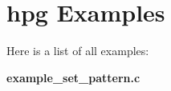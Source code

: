 \section{hpg Examples}
Here is a list of all examples:\begin{CompactItemize}
\item 
{\bf example\_\-set\_\-pattern.c}
\end{CompactItemize}
